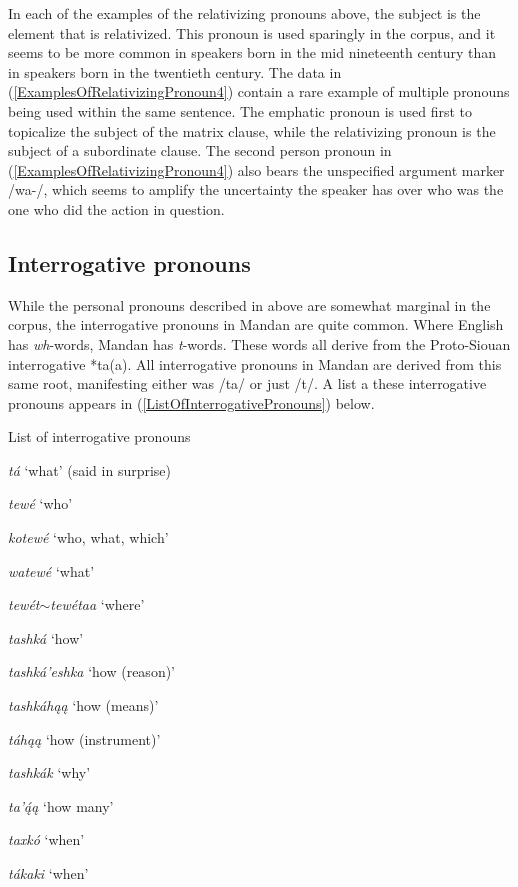 In each of the examples of the relativizing pronouns above, the subject is the element that is relativized. This pronoun is used sparingly in the corpus, and it seems to be more common in speakers born in the mid nineteenth century than in speakers born in the twentieth century. The data in (\ref{ExamplesOfRelativizingPronoun4}) contain a rare example of multiple pronouns being used within the same sentence. The emphatic pronoun is used first to topicalize the subject of the matrix clause, while the relativizing pronoun is the subject of a subordinate clause. The second person pronoun in (\ref{ExamplesOfRelativizingPronoun4}) also bears the unspecified argument marker /wa-/, which seems to amplify the uncertainty the speaker has over who was the one who did the action in question.

\subsection{Interrogative pronouns}\label{SubSecInterrogativePronouns}

While the personal pronouns described in  above are somewhat marginal in the corpus, the interrogative pronouns in Mandan are quite common. Where English has \textit{wh}-words, Mandan has \textit{t}-words. These words all derive from the Proto-Siouan interrogative *ta(a). All interrogative pronouns in Mandan are derived from this same root, manifesting either was /ta/ or just /t/. A list a these interrogative pronouns appears in (\ref{ListOfInterrogativePronouns}) below.

\begin{exe}

\item\label{ListOfInterrogativePronouns} List of interrogative pronouns

    \begin{xlist}
    \item \textit{tá} `what' (said in surprise)
    \item \textit{tewé} `who' 
    \item \textit{kotewé} `who, what, which'
    \item \textit{watewé} `what' 
    \item \textit{tewét}$\sim$\textit{tewétaa} `where'
    \item \textit{tashká} `how' 
    \item \textit{tashká'eshka} `how (reason)'
    \item \textit{tashkáhąą} `how (means)'
    \item \textit{táhąą} `how (instrument)'
    \item \textit{tashkák} `why'
    \item \textit{ta'ą́ą} `how many'
    \item \textit{taxkó} `when'
    \item \textit{tákaki} `when'
    \end{xlist}

\end{exe}

